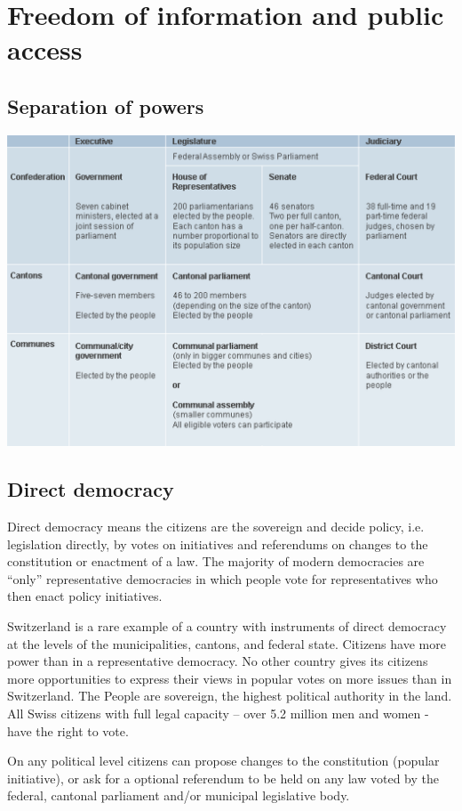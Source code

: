 \section{Freedom of information and public access}
\subsection{Separation of powers}
\includegraphics[width=1\linewidth]{images/separation_of_powers}

\subsection{Direct democracy}
\begin{compactitem}
	\item Direct democracy means the citizens are the sovereign and decide policy, i.e. legislation directly, by votes on initiatives and referendums on changes to the constitution or enactment of a law. The majority of modern democracies are “only” representative democracies in which people vote for representatives who then enact policy initiatives.
	\item Switzerland is a rare example of a country with instruments of direct	democracy at the levels of the municipalities, cantons, and federal state. Citizens have more power than in a representative democracy. No other country gives its citizens more opportunities to express their views in popular votes on more issues than in Switzerland. The People are sovereign, the highest political authority in the land. All Swiss citizens with full legal capacity – over 5.2 million men and women - have the right to vote.
	\item On any political level citizens can propose changes to the constitution (popular initiative), or ask for a optional referendum to be held on any law voted by the federal, cantonal parliament and/or municipal legislative body.
\end{compactitem}

